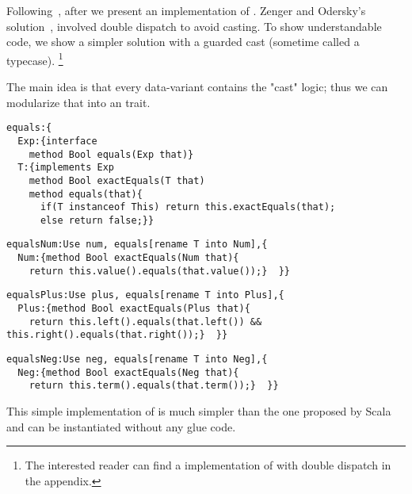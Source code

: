 Following~\cite{Zenger-Odersky2005}, after \Q@double@ we present an implementation of \Q@equals@.
Zenger and Odersky's solution~\cite{Zenger-Odersky2005}, involved double dispatch to avoid casting.
To show understandable code, we show a simpler solution 
with a guarded cast (sometime called a typecase).%
\footnote{
The interested reader can find a \name implementation of \Q@equals@ with double dispatch
in the appendix.
}

The main idea is that  every data-variant  contains
 the "cast" logic; thus
 we can modularize that into an \Q@equals@ trait.
\begin{lstlisting}
equals:{
  Exp:{interface
    method Bool equals(Exp that)}
  T:{implements Exp
    method Bool exactEquals(T that)
    method equals(that){
      if(T instanceof This) return this.exactEquals(that);
      else return false;}}
\end{lstlisting}
\multiCode
\begin{lstlisting}
equalsNum:Use num, equals[rename T into Num],{
  Num:{method Bool exactEquals(Num that){
    return this.value().equals(that.value());}  }}
\end{lstlisting}
\multiCode
\begin{lstlisting}
equalsPlus:Use plus, equals[rename T into Plus],{
  Plus:{method Bool exactEquals(Plus that){
    return this.left().equals(that.left()) && this.right().equals(that.right());}  }}
\end{lstlisting}
\multiCode
\begin{lstlisting}
equalsNeg:Use neg, equals[rename T into Neg],{
  Neg:{method Bool exactEquals(Neg that){
    return this.term().equals(that.term());}  }}
\end{lstlisting}

This simple implementation of \Q@equals@
is much simpler than the one proposed by Scala
 and can be instantiated without any glue code.

